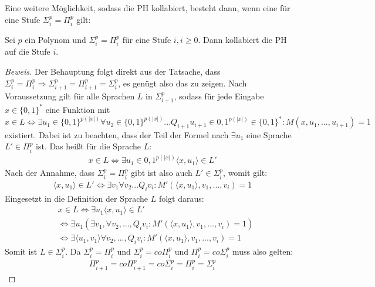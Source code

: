 Eine weitere Möglichkeit, sodass die PH kollabiert, besteht dann, wenn eine für eine Stufe $\Sigma^p_i = \Pi^p_i$ gilt:

\begin{theorem}
    Sei $p$ ein Polynom und $\Sigma^p_i = \Pi^p_i$ für eine Stufe $i, i \geq 0$. Dann kollabiert die PH auf die Stufe $i$.
\end{theorem}

\begin{proof}[Beweis]
    Der Behauptung folgt direkt aus der Tatsache, dass $\Sigma^p_i = \Pi^p_i \Rightarrow \Sigma^p_{i+1} = \Pi^p_{i+1} = \Sigma^p_i$, es genügt also das zu zeigen.
    Nach Voraussetzung gilt für alle Sprachen $L$ in $\Sigma^p_{i+1}$, sodass für jede Eingabe $x \in \{0,1\}^*$ eine Funktion mit 
    $$
    x \in L \Leftrightarrow \exists u_1 \in \{0,1\}^{p(|x|)} \forall u_2 \in \{0,1\}^{p(|x|)} ... Q_{i+1}u_{i + 1} \in {0,1}^{p(|x|)} \in \{0,1\}^* : M(x, u_1, ..., u_{i+1}) = 1
    $$
    existiert.
    Dabei ist zu beachten, dass der Teil der Formel nach $\exists u_1$ eine Sprache $L' \in \Pi^p_i$ ist.
    Das heißt für die Sprache $L$:
    \begin{align*}
    x \in L \Leftrightarrow \exists u_1 \in {0,1}^{p(|x|)} \langle x, u_1 \rangle \in L'
    \end{align*}
    Nach der Annahme, dass  $\Sigma^p_i = \Pi^p_i$ gibt ist also auch $L' \in \Sigma^p_i$, womit gilt:
    \begin{align*}
    \langle x, u_1 \rangle \in L' \Leftrightarrow \exists v_1 \forall v_2 ... Q_i v_i : M'(\langle x, u_1 \rangle, v_1, ..., v_i) = 1 
    \end{align*}
    Eingesetzt in die Definition der Sprache $L$ folgt daraus:
    \begin{align*}
    & x \in L \Leftrightarrow \exists u_1 \langle x, u_1 \rangle \in L' \\
    & \Leftrightarrow \exists u_1 (\exists v_1, \forall v_2, ..., Q_i v_i :  M'(\langle x, u_1 \rangle, v_1, ..., v_i) = 1) \\
    & \Leftrightarrow \exists \langle u_1, v_1 \rangle \forall v_2, ..., Q_i v_i : M'(\langle x, u_1 \rangle, v_1, ..., v_i) = 1
    \end{align*}
    Somit ist $L \in \Sigma^p_i$. Da $\Sigma^p_i = \Pi^p_i$ und $\Sigma^p_i = co\Pi^p_i$ und $\Pi^p_i = co\Sigma^p_i$ muss also gelten:
    \begin{align*}
    \Pi^p_{i+1} = co\Pi^p_{i+1} = co\Sigma^p_i = \Pi^p_i = \Sigma^p_i
    \end{align*}
\end{proof}